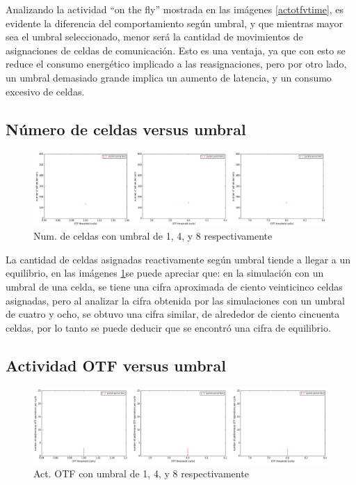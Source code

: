     Analizando la actividad ``on the fly'' mostrada en las imágenes \ref{actotfvtime}, es evidente la diferencia del comportamiento según umbral, y que mientras mayor sea el umbral seleccionado, menor será la cantidad de movimientos de asignaciones de celdas de comunicación. Esto es una ventaja, ya que con esto se reduce el consumo energético implicado a las reasignaciones, pero por otro lado, un umbral demasiado grande implica un aumento de latencia, y un consumo excesivo de celdas.
    


\subsection{Número de celdas versus umbral}

        \begin{figure}[h]
        \graphicspath{ {imagenes/agrupadas/} }
        \centering
        \includegraphics[width=1.0\textwidth]{numcelvsthre.png}
        \caption{Num. de celdas con umbral de 1, 4, y 8 respectivamente}
        \label{numcelvthr}
        \end{figure}

    La cantidad de celdas asignadas reactivamente según umbral tiende a llegar a un equilibrio, en las imágenes \ref{numcelvthr}se puede apreciar que: en la simulación con un umbral de una celda, se tiene una cifra aproximada de ciento veinticinco celdas asignadas, pero al analizar la cifra obtenida por las simulaciones con un umbral de cuatro y ocho, se obtuvo una cifra similar, de alrededor de ciento cincuenta celdas, por lo tanto se puede deducir que se encontró una cifra de equilibrio.


\subsection{Actividad OTF versus umbral}

        \begin{figure}[h]
        \graphicspath{ {imagenes/agrupadas/} }
        \centering
        \includegraphics[width=1.0\textwidth]{otfactvthr.png}
        \caption{Act. OTF con umbral de 1, 4, y 8 respectivamente}
        \label{otfactvthr}
        \end{figure}

